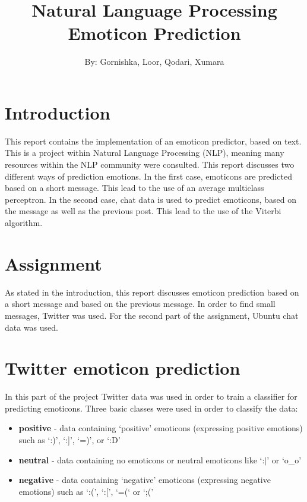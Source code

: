 \documentclass{article}
\begin{document}
\title{Natural Language Processing \\ Emoticon Prediction}

\author{By: Gornishka, Loor, Qodari, Xumara}
\maketitle


\tableofcontents

\pagebreak

\section*{Introduction}

This report contains the implementation of an emoticon predictor, based on text. This is a project within Natural Language Processing (NLP), meaning many resources within the NLP community were consulted. This report discusses two different ways of prediction emotions. In the first case, emoticons are predicted based on a short message. This lead to the use of an average multiclass perceptron. In the second case, chat data is used to predict emoticons, based on the message as well as the previous post. This lead to the use of the Viterbi algorithm.

\section*{Assignment}

As stated in the introduction, this report discusses emoticon prediction based on a short message and based on the previous message. In order to find small messages, Twitter was used. For the second part of the assignment, Ubuntu chat data was used.

\pagebreak

\section*{Twitter emoticon prediction}

In this part of the project Twitter data was used in order to train a classifier for predicting emoticons. Three basic classes were used in order to classify the data:

\begin{itemize}
\item \textbf{positive} - data containing `positive' emoticons (expressing positive emotions) such as `:)', `:]', `=)', or `:D'
\item \textbf{neutral} - data containing no emoticons or neutral emoticons like `:$\vert$' or `o\_o'
\item \textbf{negative} - data containing `negative' emoticons (expressing negative emotions) such as `:(', `:[', `=(` or `;(' 
\end{itemize}
\end{document}
